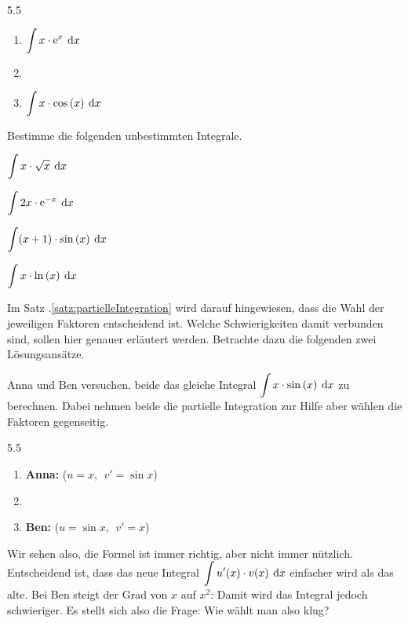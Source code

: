 	\begin{beispiel}\ \\
		\vspace{-8mm}
		\begin{gridspace}{5.5}
			\begin{enumerate}[label=\ , leftmargin=0mm]\vspace{-1.75mm}
				\item $\displaystyle\int x\cdot\operatorname{\operatorname{e}}^{x}\:\operatorname{d}\!{x}$
				\item
				\item $\ds\int x\*\cos{x}\d{x}$
			\end{enumerate}
		\end{gridspace}
	\end{beispiel}
	\begin{aufgabe}
		Bestimme die folgenden unbestimmten Integrale.
			\begin{enumcols}[2]
				\item $\displaystyle\int x\cdot\sqrt{x}\:\operatorname{d}\!{x}$
				\item $\displaystyle\int 2x\cdot\operatorname{\operatorname{e}}^{-x}\:\operatorname{d}\!{x}$
				\item $\ds\int (x+1)\*\sin{x}\d{x}$
				\item $\ds\int x\*\ln{x}\d{x}$
			\end{enumcols}
	\end{aufgabe}
	Im Satz \thesection.\ref{satz:partielleIntegration} wird darauf hingewiesen, dass die Wahl der jeweiligen Faktoren entscheidend ist. Welche Schwierigkeiten damit verbunden sind, sollen hier genauer erläutert werden. Betrachte dazu die folgenden zwei Lösungsansätze.
	\begin{aufgabe}
		Anna und Ben versuchen, beide das gleiche Integral $\ds\int x\*\sin{x}\d{x}$ zu berechnen. Dabei nehmen beide die partielle Integration zur Hilfe aber wählen die Faktoren gegenseitig.
		\begin{gridspace}{5.5}
			\begin{enumerate}[label=\ ,leftmargin=0mm]
				\item {\bf Anna:} ($u=x,\:\: v'=\sin{x}$)
				\item
				\item {\bf Ben:} ($u=\sin{x},\:\: v'=x$)
			\end{enumerate}
		\end{gridspace}
	\end{aufgabe}
	Wir sehen also, die Formel ist immer richtig, aber nicht immer nützlich. Entscheidend ist, dass das neue Integral $\displaystyle\int u'(x)\cdot v(x)\:\operatorname{d}\!{x}$ einfacher wird als das alte. Bei Ben steigt der Grad von $x$ auf $x^2$: Damit wird das Integral jedoch schwieriger. Es stellt sich also die Frage: \flqq Wie wählt man also klug?\frqq
